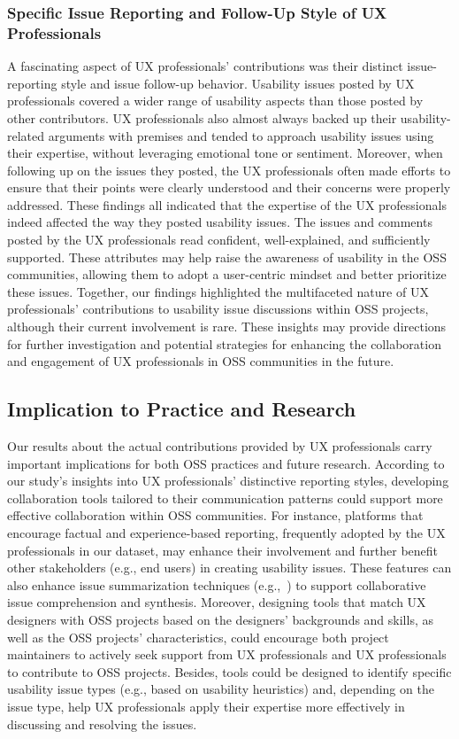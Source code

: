 \subsubsection{Specific Issue Reporting and Follow-Up Style of UX Professionals}
A fascinating aspect of UX professionals' contributions was their distinct issue-reporting style and issue follow-up behavior. Usability issues posted by UX professionals covered a wider range of usability aspects than those posted by other contributors. UX professionals also almost always backed up their usability-related arguments with premises and tended to approach usability issues using their expertise, without leveraging emotional tone or sentiment. Moreover, when following up on the issues they posted, the UX professionals often made efforts to ensure that their points were clearly understood and their concerns were properly addressed. These findings all indicated that the expertise of the UX professionals indeed affected the way they posted usability issues. The issues and comments posted by the UX professionals read confident, well-explained, and sufficiently supported. These attributes may help raise the awareness of usability in the OSS communities, allowing them to adopt a user-centric mindset and better prioritize these issues. Together, our findings highlighted the multifaceted nature of UX professionals' contributions to usability issue discussions within OSS projects, although their current involvement is rare. These insights may provide directions for further investigation and potential strategies for enhancing the collaboration and engagement of UX professionals in OSS communities in the future.

\subsection{Implication to Practice and Research}
Our results about the actual contributions provided by UX professionals carry important implications for both OSS practices and future research. According to our study's insights into UX professionals' distinctive reporting styles, developing collaboration tools tailored to their communication patterns could support more effective collaboration within OSS communities. For instance, platforms that encourage factual and experience-based reporting, frequently adopted by the UX professionals in our dataset, may enhance their involvement and further benefit other stakeholders (e.g., end users) in creating usability issues. These features can also enhance issue summarization techniques (e.g.,~\cite{Gilmer2023}) to support collaborative issue comprehension and synthesis. Moreover, designing tools that match UX designers with OSS projects based on the designers' backgrounds and skills, as well as the OSS projects' characteristics, could encourage both project maintainers to actively seek support from UX professionals and UX professionals to contribute to OSS projects. Besides, tools could be designed to identify specific usability issue types (e.g., based on usability heuristics) and, depending on the issue type, help UX professionals apply their expertise more effectively in discussing and resolving the issues.

